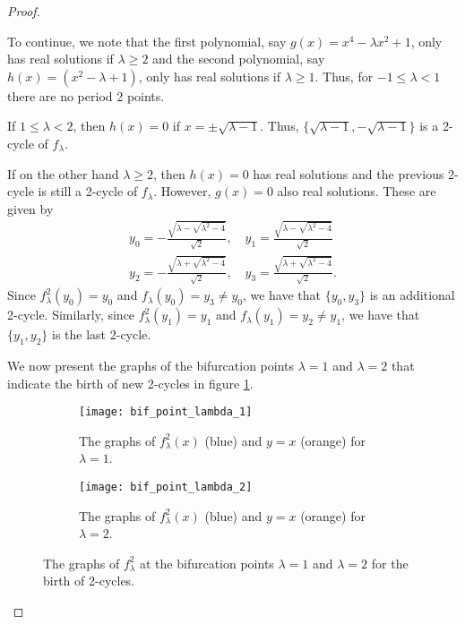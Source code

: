 \begin{proof}
\begin{enumerate}
      To continue, we note that the first polynomial,  say $g(x) = x^4- \lambda x^2 + 1$, only has real solutions
      if $\lambda \geq 2$ and the second polynomial, say $h(x) = (x^2 - \lambda + 1)$, only has real solutions if $\lambda \geq 1$.
      Thus, for $-1 \leq \lambda < 1$ there are no period 2 points.

      If $1 \leq \lambda < 2$, then $h(x) = 0$ if $x = \pm \sqrt{\lambda - 1}$.
      Thus, $\{\sqrt{\lambda - 1}, - \sqrt{\lambda - 1}\}$ is a 2-cycle of $f_\lambda$.

      If on the other hand $\lambda \geq 2$, then $h(x) = 0$ has real solutions and the previous 2-cycle is still a 2-cycle
      of $f_\lambda$. However, $g(x) = 0$ also real solutions. These are given by
      \begin{align*}
        y_0 = -\frac{\sqrt{\lambda - \sqrt{\lambda^2-4}}}{\sqrt{2}}, \quad
        y_1 = \frac{\sqrt{\lambda - \sqrt{\lambda^2-4}}}{\sqrt{2}}\\
        y_2 = -\frac{\sqrt{\lambda + \sqrt{\lambda^2-4}}}{\sqrt{2}}, \quad
        y_3 = \frac{\sqrt{\lambda + \sqrt{\lambda^2-4}}}{\sqrt{2}}.
      \end{align*}
      Since $f_\lambda^2(y_0) = y_0$ and $f_\lambda(y_0) = y_3 \neq y_0$, we have that $\{y_0, y_3\}$ is an additional 2-cycle.
      Similarly, since $f_\lambda^2(y_1) = y_1$ and $f_\lambda(y_1) = y_2 \neq y_1$, we have that $\{y_1, y_2\}$ is the last 2-cycle.

      We now present the graphs of the bifurcation points $\lambda = 1$ and $\lambda = 2$ that indicate the
      birth of new 2-cycles in figure \ref{bif}.

      \begin{figure}[!h]
        \centering
        \begin{subfigure}{.45\textwidth}
          \centering
          \centerline{\texttt{[image: bif\_point\_lambda\_1]}}
          \caption{The graphs of $f_\lambda^2(x)$ (blue) and $y=x$ (orange) for $\lambda = 1$.}
        \end{subfigure}
        \begin{subfigure}{.45\textwidth}
          \centering
          \centerline{\texttt{[image: bif\_point\_lambda\_2]}}
          \caption{The graphs of $f_\lambda^2(x)$ (blue) and $y=x$ (orange) for $\lambda = 2$.}
        \end{subfigure}
        \caption{The graphs of $f_\lambda^2$ at the bifurcation points $\lambda=1$ and $\lambda=2$ for the birth of 2-cycles. }
        \label{bif}
      \end{figure}


\end{enumerate}
\end{proof}
